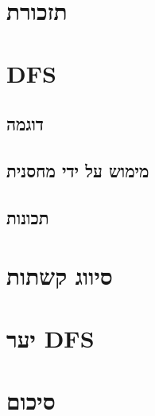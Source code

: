 \documentclass[]{article}
\def\insert#1{}
\begin{document}
\def\lecnum{2}
\def\topcis{
חיפוש לעומק -
\textenglish{Depth First Search (DFS)}
}

\section*{תזכורת}
\insert{reminder}
\section*{DFS}
\insert{dfs}
	\subsection*{דוגמה}
	\insert{example1}
	\subsection*{מימוש על ידי מחסנית}
	\insert{stack}
	\subsection*{תכונות}
	\insert{properties}
\section*{סיווג קשתות}
\insert{edges}
\section*{יער DFS}
\insert{forest}
\section*{סיכום}
\insert{conclusion}
\end{document}
